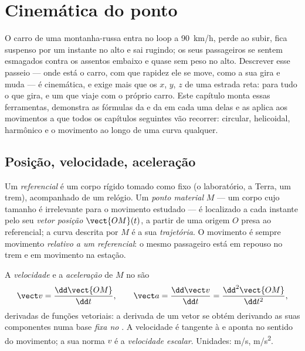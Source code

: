 \chapter{Cinemática do ponto}\label{ch:b1:point-kinematics}

O carro de uma montanha-russa entra no loop a \qty{90}{km/h}, perde
 ao subir, fica suspenso por um instante no alto e sai rugindo;
os seus passageiros se sentem esmagados contra os assentos embaixo e quase
sem peso no alto. Descrever esse passeio --- onde está o carro, com que
rapidez ele se move, como a sua  gira e muda --- é cinemática,
e exige mais que os $x$, $y$, $z$ de uma estrada reta: 
para tudo o que gira, e um  que viaje com o próprio
carro. Este capítulo monta essas ferramentas, demonstra as fórmulas da
 e da  em cada uma delas e as aplica aos
movimentos a que todos os capítulos seguintes vão recorrer: circular, helicoidal,
harmônico e o movimento ao longo de uma curva qualquer.

\section{Posição, velocidade, aceleração}

\begin{definition}\label{def:b1:point-kinematics:frame}
Um \emph{referencial} é um corpo rígido tomado como fixo (o
laboratório, a Terra, um trem), acompanhado de um relógio. Um \emph{ponto
material} $M$ --- um corpo cujo tamanho é irrelevante para o movimento estudado
--- é localizado a cada instante pelo seu \emph{vetor posição}
$\vect{OM}(t)$, a partir de uma origem $O$ presa ao referencial; a curva
descrita por $M$ é a sua \emph{trajetória}. O movimento é sempre movimento
\emph{relativo a um referencial}: o mesmo passageiro está em repouso no trem
e em movimento na estação.
\end{definition}

\begin{definition}\label{def:b1:point-kinematics:velocity}
A \emph{velocidade} e a \emph{aceleração} de $M$ no  são
\[
\vect v = \frac{\dd\vect{OM}}{\dd t}, \qquad
\vect a = \frac{\dd\vect v}{\dd t} = \frac{\dd^2\vect{OM}}{\dd t^2},
\]
derivadas de funções vetoriais: a derivada de um vetor se
obtém derivando as suas componentes numa base
\emph{fixa no }. A velocidade é tangente à 
e aponta no sentido do movimento; a sua norma $v$ é a \emph{velocidade escalar}. Unidades:
\unit{m/s}, \unit{m/s^2}.
\end{definition}

